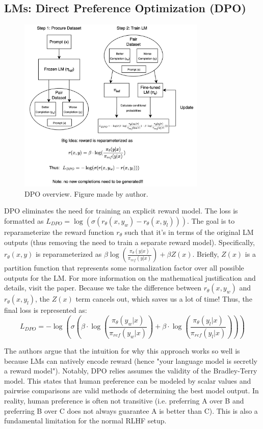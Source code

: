 \documentclass[12pt]{article}
\begin{document}
\subsection{LMs: Direct Preference Optimization (DPO)}
\begin{figure}[H]
    \centering
    \includegraphics[width=0.8\textwidth]{../media/dpo_light.png}
    \caption{DPO overview. Figure made by author. }
    \label{fig:dpo}
\end{figure}

DPO eliminates the need for training an explicit reward model. The loss is formatted as $L_{DPO} = \log(\sigma(r_{\theta}(x, y_w) - r_{\theta}(x, y_l)))$. The goal is to reparameterize the reward function $r_{\theta}$ such that it's in terms of the original LM outputs (thus removing the need to train a separate reward model). Specifically, $r_{\theta}(x,y)$ is reparameterized as $
\beta \log(\frac{\pi_{\theta}(y | x)}{\pi_{ref}(y | x)}) + \beta Z(x)$. Briefly, $Z(x)$ is a partition function that represents some normalization factor over all possible outputs for the LM. For more information on the mathematical justification and details, visit the paper. Because we take the difference between $r_{\theta}(x, y_w)$ and $r_{\theta}(x, y_l)$, the $Z(x)$ term cancels out, which saves us a lot of time! Thus, the final loss is represented as:
\[
L_{DPO}=-\log(\sigma(\beta \cdot \log(\frac{\pi_{\theta}(y_w | x)}{\pi_{ref}(y_w | x)}) + \beta \cdot \log(\frac{\pi_{\theta}(y_l | x)}{\pi_{ref}(y_l | x)})))
\]

The authors argue that the intuition for why this approach works so well is because LMs can natively encode reward (hence "your language model is secretly a reward model"). Notably, DPO relies assumes the validity of the Bradley-Terry model. This states that human preference can be modeled by scalar values and pairwise comparisons are valid methods of determining the best model output. In reality, human preference is often not transitive (i.e. preferring A over B and preferring B over C does not always guarantee A is better than C). This is also a fundamental limitation for the normal RLHF setup. 
\end{document}
